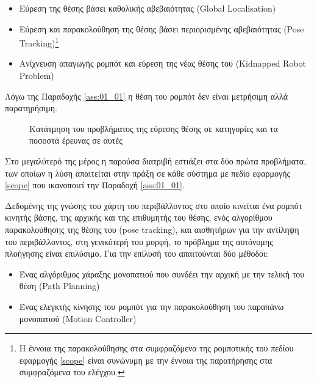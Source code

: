 \begin{itemize}
  \item Εύρεση της θέσης βάσει καθολικής αβεβαιότητας (Global Localisation)
  \item Εύρεση και παρακολούθηση της θέσης βάσει περιορισμένης αβεβαιότητας
        (Pose Tracking)\footnote{Η έννοια της παρακολούθησης στα συμφραζόμενα
        της ρομποτικής του πεδίου εφαρμογής \ref{scope} είναι συνώνυμη με την
        έννοια της παρατήρησης στα συμφραζόμενα του ελέγχου.}
  \item Ανίχνευση απαγωγής ρομπότ και εύρεση της νέας θέσης του (Kidnapped Robot
        Problem)
\end{itemize}

\begin{gg_box}
\begin{remark}
  Λόγω της Παραδοχής \ref{ass:01_01} η θέση του ρομπότ δεν είναι μετρήσιμη
  αλλά παρατηρήσιμη.
  \label{remark:observable}
\end{remark}
\end{gg_box}

\begin{figure}\centering
  \vspace{-1cm}
  
  \vspace{-2cm}
  \caption{\small Κατάτμηση του προβλήματος της εύρεσης θέσης σε κατηγορίες και
           τα ποσοστά έρευνας σε αυτές \cite{Panigrahi2021}}
  \label{fig:localisation_problems_pie}
\end{figure}

Στο μεγαλύτερό της μέρος η παρούσα διατριβή εστιάζει στα δύο πρώτα προβλήματα,
των οποίων η λύση απαιτείται στην πράξη σε κάθε σύστημα με πεδίο εφαρμογής
\ref{scope} που ικανοποιεί την Παραδοχή \ref{ass:01_01}.

Δεδομένης της γνώσης του χάρτη του περιβάλλοντος στο οποίο κινείται ένα ρομπότ
κινητής βάσης, της αρχικής και της επιθυμητής του θέσης, ενός αλγορίθμου
παρακολούθησης της θέσης του (pose tracking), και αισθητήρων για την αντίληψη
του περιβάλλοντος, στη γενικότερή του μορφή, το πρόβλημα της αυτόνομης πλοήγησης
είναι επιλύσιμο. Για την επίλυσή του απαιτούνται δύο μέθοδοι:

\begin{itemize}
  \item Ένας αλγόριθμος χάραξης μονοπατιού που συνδέει την αρχική με την τελική
        του θέση (Path Planning)
  \item Ένας ελεγκτής κίνησης του ρομπότ για την παρακολούθηση του παραπάνω
        μονοπατιού (Motion Controller)
\end{itemize}


